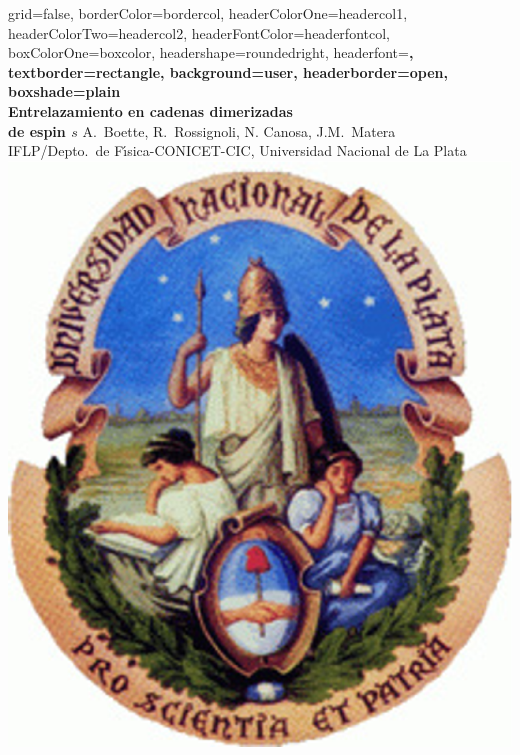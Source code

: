 \documentclass[a0paper,portrait]{baposter}
\begin{document}
\begin{poster}{
grid=false,
borderColor=bordercol, %
headerColorOne=headercol1, %
headerColorTwo=headercol2, %
headerFontColor=headerfontcol, %
boxColorOne=boxcolor, %
headershape=roundedright, %
headerfont=\Large\sf\bf, %
textborder=rectangle,
background=user,
headerborder=open, %
boxshade=plain
}
{}
%
{\sf\bf\\ Entrelazamiento en cadenas dimerizadas\\ \vspace{.25em} de espin $s$ } %
{\vspace{.5em} A.\ Boette, R.\ Rossignoli, N. Canosa, J.M.\ Matera\\ %
{\vspace{.25em}  IFLP/Depto.\ de F\'{\i}sica-CONICET-CIC,
	Universidad Nacional de La Plata}}
{\includegraphics*[scale=0.25]{unlp.eps}} %


\end{poster}
\end{document}
